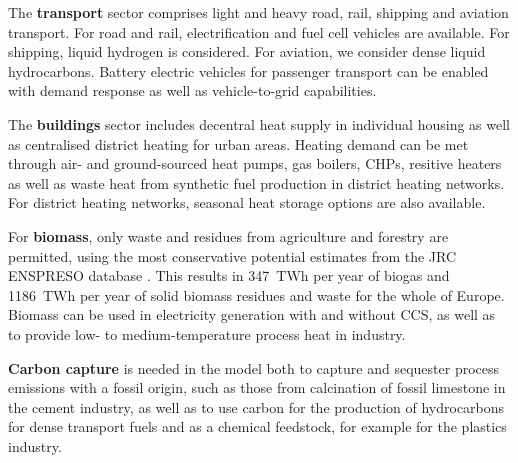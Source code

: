 The \textbf{transport} sector comprises light and heavy road, rail, shipping and
aviation transport. For road and rail, electrification and fuel cell vehicles
are available. For shipping, liquid hydrogen is considered. For aviation, we
consider dense liquid hydrocarbons. Battery electric vehicles for passenger
transport can be enabled with demand response as well as vehicle-to-grid
capabilities.

The \textbf{buildings} sector includes decentral heat supply in individual
housing as well as centralised district heating for urban areas. Heating demand
can be met through air- and ground-sourced heat pumps, gas boilers, CHPs,
resitive heaters as well as waste heat from synthetic fuel production in
district heating networks. For district heating networks, seasonal heat storage
options are also available.

For \textbf{biomass}, only waste and residues from agriculture and forestry are
permitted, using the most conservative potential estimates from the JRC ENSPRESO
database \cite{jrcbiomass2015}. This results in 347~TWh per year of biogas and
1186~TWh per year of solid biomass residues and waste for the whole of Europe.
Biomass can be used in electricity generation with and without CCS, as well as
to provide low- to medium-temperature process heat in industry.

\textbf{Carbon capture} is needed in the model both to capture and sequester
process emissions with a fossil origin, such as those from calcination of fossil
limestone in the cement industry, as well as to use carbon for the production of
hydrocarbons for dense transport fuels and as a chemical feedstock, for example
for the plastics industry.